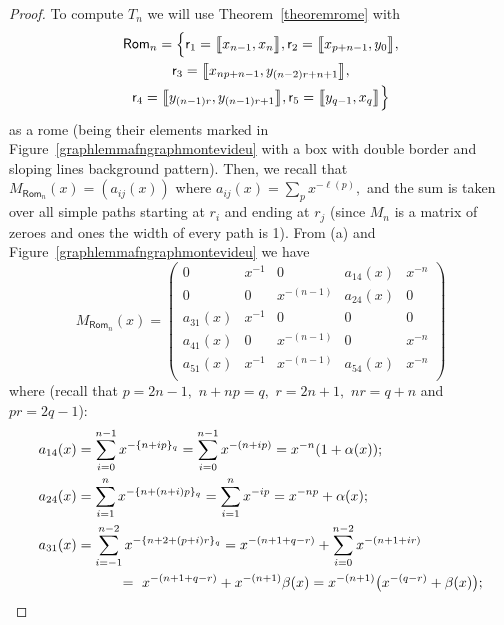 \documentclass[a4paper, 11pt]{amsart}
\numberwithin{equation}{section}
\theoremstyle{customnumberedtheorem}
\theoremstyle{definitionwithbfnote}
\newcommand{\bigBIclass}[1]{\ensuremath{\bigl\llbracket #1\bigr\rrbracket}}
\newcommand{\modulo}[2]{\{#1\}\sb{#2}}
\begin{document}
\begin{proof}
To compute $T_n$ we will use Theorem~\ref{theoremrome} with
\begin{multline*}
\textsf{Rom}_n = \Bigl\{\textsf{r}_1 = \bigBIclass{x_{n-1},x_n},
                   \textsf{r}_2 = \bigBIclass{x_{p+n-1},y_0},\\
                   \textsf{r}_3 = \bigBIclass{x_{np+n-1},y_{(n-2)r +n+1}}, \\
                   \textsf{r}_4 = \bigBIclass{y_{(n-1)r},y_{(n-1)r +1}},
                   \textsf{r}_5 = \bigBIclass{y_{q-1},x_q}\Bigr\}
\end{multline*}
as a rome (being their elements marked in
Figure~\ref{graphlemmafngraphmontevideu} with a box
with double border and sloping lines background pattern).
Then, we recall that $M_{\textsf{Rom}_n}(x) = (a_{ij}(x))$
where $a_{ij}(x) = \sum_p x^{-\ell(p)},$
and the sum is taken over all simple paths
starting at $r_i$ and ending at $r_j$
(since $M_n$ is  a matrix of zeroes and ones the width of every path is 1).
From (a) and Figure~\ref{graphlemmafngraphmontevideu} we have
\[
M_{\textsf{Rom}_n}(x) = \begin{pmatrix}
           0    & x^{-1} &      0     & a_{14}(x) & x^{-n} \\
           0    &     0  & x^{-(n-1)} & a_{24}(x) &   0 \\
      a_{31}(x) & x^{-1} &      0     &      0    &   0 \\
      a_{41}(x) &     0  & x^{-(n-1)} &      0    & x^{-n} \\
      a_{51}(x) & x^{-1} & x^{-(n-1)} & a_{54}(x) & x^{-n} \\
\end{pmatrix}
\]
where
(recall that $p = 2n -1,$ $n + np = q,$ $r = 2n +1,$ $nr = q + n$ and $pr = 2q-1$):
\begin{align*}
   a_{14}(x) &= \sum_{i=0}^{n-1} x^{-\modulo{n+ip}{q}} = \sum_{i=0}^{n-1} x^{-(n+ip)} = %
                x^{-n}(1+\alpha(x));\\
   a_{24}(x) &= \sum_{i=1}^{n} x^{-\modulo{n+(n+i)p}{q}} = \sum_{i=1}^{n} x^{-ip} = x^{-np} + \alpha(x);\\
   a_{31}(x) &= \sum_{i=-1}^{n-2} x^{-\modulo{n+2+(p+i)r}{q}} = x^{-(n+1+q-r)} + \sum_{i=0}^{n-2} x^{-(n+1+ir)}\\ %
             &\hspace*{3em}=\ x^{-(n+1+q-r)} + x^{-(n+1)}\beta(x) = x^{-(n+1)}\bigl(x^{-(q-r)} + \beta(x)\bigr);\\

\end{align*}
\end{proof}
\end{document}
